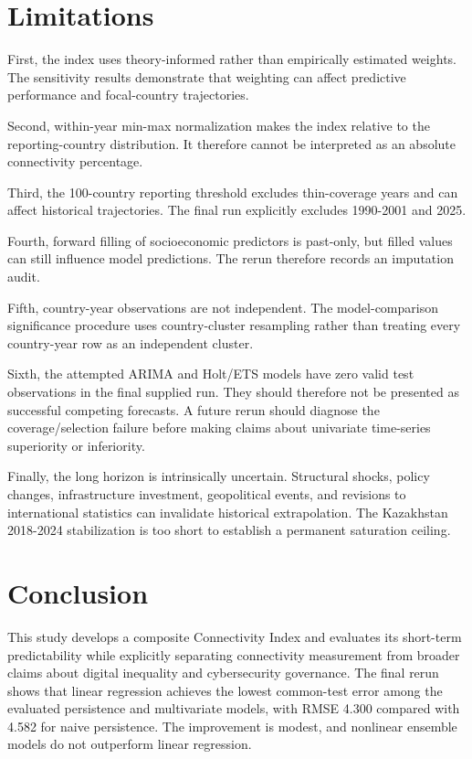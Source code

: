 \documentclass[conference]{IEEEtran}
\begin{document}
\section{Limitations}

First, the index uses theory-informed rather than empirically estimated weights. The sensitivity results demonstrate that weighting can affect predictive performance and focal-country trajectories.

Second, within-year min-max normalization makes the index relative to the reporting-country distribution. It therefore cannot be interpreted as an absolute connectivity percentage.

Third, the 100-country reporting threshold excludes thin-coverage years and can affect historical trajectories. The final run explicitly excludes 1990-2001 and 2025.

Fourth, forward filling of socioeconomic predictors is past-only, but filled values can still influence model predictions. The rerun therefore records an imputation audit.

Fifth, country-year observations are not independent. The model-comparison significance procedure uses country-cluster resampling rather than treating every country-year row as an independent cluster.

Sixth, the attempted ARIMA and Holt/ETS models have zero valid test observations in the final supplied run. They should therefore not be presented as successful competing forecasts. A future rerun should diagnose the coverage/selection failure before making claims about univariate time-series superiority or inferiority.

Finally, the long horizon is intrinsically uncertain. Structural shocks, policy changes, infrastructure investment, geopolitical events, and revisions to international statistics can invalidate historical extrapolation. The Kazakhstan 2018-2024 stabilization is too short to establish a permanent saturation ceiling.

\section{Conclusion}

This study develops a composite Connectivity Index and evaluates its short-term predictability while explicitly separating connectivity measurement from broader claims about digital inequality and cybersecurity governance. The final rerun shows that linear regression achieves the lowest common-test error among the evaluated persistence and multivariate models, with RMSE 4.300 compared with 4.582 for naive persistence. The improvement is modest, and nonlinear ensemble models do not outperform linear regression.
\end{document}
